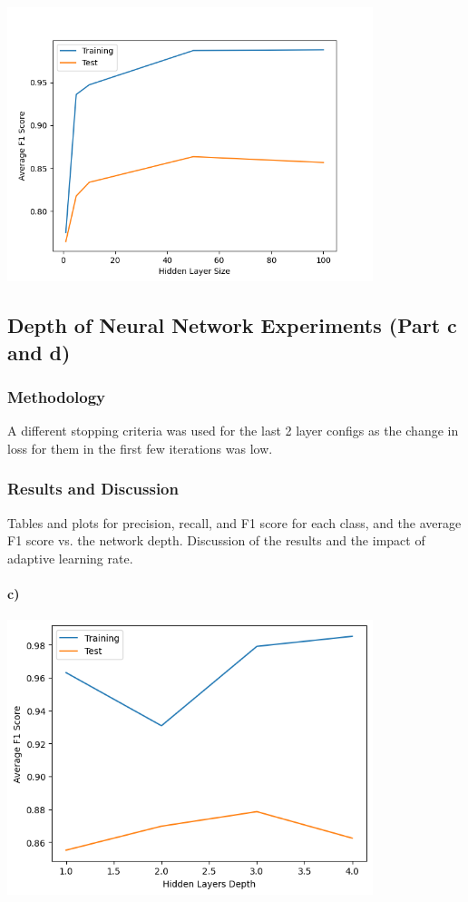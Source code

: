\documentclass[12pt]{article}
\begin{document}
\begin{center}
    \includegraphics[width=0.8\textwidth]{Assignment 3/q2/(b) f1 vs hidden_size.png}
\end{center}



\subsection{Depth of Neural Network Experiments (Part c and d)}
\subsubsection{Methodology}
A different stopping criteria was used for the last 2 layer configs as the change in loss for them in the first few iterations was low.

\subsubsection{Results and Discussion}
Tables and plots for precision, recall, and F1 score for each class, and the average F1 score vs. the network depth. Discussion of the results and the impact of adaptive learning rate.
\paragraph{c) }
\begin{center}
    \includegraphics[width=0.8\textwidth]{Assignment 3/q2/(c) f1 vs hidden_depth.png}
\end{center}
\end{document}
